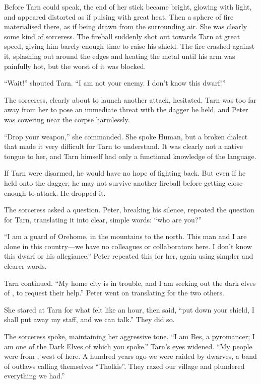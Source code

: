 Before Tarn could speak, the end of her stick became bright, glowing with light, and appeared distorted as if pulsing with great heat.  Then a sphere of fire materialised there, as if being drawn from the surrounding air.  She was clearly some kind of sorceress.  The fireball suddenly shot out towards Tarn at great speed, giving him barely enough time to raise his shield.  The fire crashed against it, splashing out around the edges and heating the metal until his arm was painfully hot, but the worst of it was blocked.

``Wait!'' shouted Tarn.  ``I am not your enemy.  I don't know this dwarf!''

The sorceress, clearly about to launch another attack, hesitated.  Tarn was too far away from her to pose an immediate threat with the dagger he held, and Peter was cowering near the corpse harmlessly.

``Drop your weapon,'' she commanded.  She spoke Human, but a broken dialect that made it very difficult for Tarn to understand. It was clearly not a native tongue to her, and Tarn himself had only a functional knowledge of the language.

If Tarn were disarmed, he would have no hope of fighting back.  But even if he held onto the dagger, he may not survive another fireball before getting close enough to attack.  He dropped it.

The sorceress asked a question.  Peter, breaking his silence, repeated the question for Tarn, translating it into clear, simple words: ``who are you?''

``I am a guard of Orehome, in the mountains to the north.  This man and I are alone in this country---we have no colleagues or collaborators here.  I don't know this dwarf or his allegiance.''  Peter repeated this for her, again using simpler and clearer words.

Tarn continued.  ``My home city is in trouble, and I am seeking out the dark elves of \yedmurdim, to request their help.''  Peter went on translating for the two others.

She stared at Tarn for what felt like an hour, then said, ``put down your shield, I shall put away my staff, and we can talk.''  They did so.

The sorceress spoke, maintaining her aggressive tone.  ``I am Bes, a pyromancer; I am one of the Dark Elves of which you spoke.''  Tarn's eyes widened.  ``My people were from \yedmurdim, west of here.  A hundred years ago we were raided by dwarves, a band of outlaws calling themselves ``Tholkis''.  They razed our village and plundered everything we had.''

